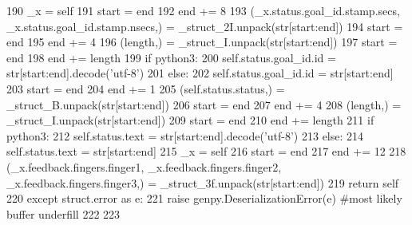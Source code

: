 \begin{DoxyCode}
190       \_x = self
191       start = end
192       end += 8
193       (\_x.status.goal\_id.stamp.secs, \_x.status.goal\_id.stamp.nsecs,) = \_struct\_2I.unpack(str[start:end])
194       start = end
195       end += 4
196       (length,) = \_struct\_I.unpack(str[start:end])
197       start = end
198       end += length
199       \textcolor{keywordflow}{if} python3:
200         self.status.goal\_id.id = str[start:end].decode(\textcolor{stringliteral}{'utf-8'})
201       \textcolor{keywordflow}{else}:
202         self.status.goal\_id.id = str[start:end]
203       start = end
204       end += 1
205       (self.status.status,) = \_struct\_B.unpack(str[start:end])
206       start = end
207       end += 4
208       (length,) = \_struct\_I.unpack(str[start:end])
209       start = end
210       end += length
211       \textcolor{keywordflow}{if} python3:
212         self.status.text = str[start:end].decode(\textcolor{stringliteral}{'utf-8'})
213       \textcolor{keywordflow}{else}:
214         self.status.text = str[start:end]
215       \_x = self
216       start = end
217       end += 12
218       (\_x.feedback.fingers.finger1, \_x.feedback.fingers.finger2, \_x.feedback.fingers.finger3,) = 
      \_struct\_3f.unpack(str[start:end])
219       \textcolor{keywordflow}{return} self
220     \textcolor{keywordflow}{except} struct.error \textcolor{keyword}{as} e:
221       \textcolor{keywordflow}{raise} genpy.DeserializationError(e) \textcolor{comment}{#most likely buffer underfill}
222 
223 
\end{DoxyCode}
